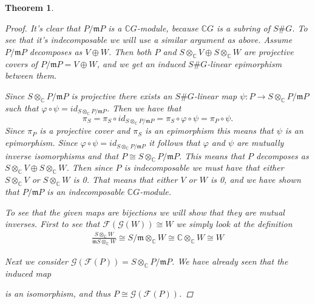\documentclass[11pt, a4paper, english]{article}
\newtheorem{theorem}{Theorem}[section]
\theoremstyle{definition}
\newcommand{\C}{\mathbb{C}}
\begin{document}
\begin{theorem}
\begin{proof}
It's clear that $P/\mathfrak{m}P$ is a $\C G$-module, because $\C G$ is a subring of $S\#G$. To see that it's indecomposable we will use a similar argument as above. Assume $P/\mathfrak{m}P$ decomposes as $V \oplus W$. Then both $P$ and $S\otimes_\C V \oplus S \otimes_\C W$ are projective covers of $P/\mathfrak{m}P = V\oplus W$, and we get an induced $S\#G$-linear epimorphism between them.

\begin{center}
\end{center}

Since $S \otimes_\C P/\mathfrak{m}P$ is projective there exists an $S\#G$-linear map $\psi: P \to S \otimes_\C P/\mathfrak{m}P$ such that $\varphi \circ \psi = id_{S \otimes_\C P/\mathfrak{m}P}$. Then we have that 
$$\pi_S = \pi_S \circ id_{S \otimes_\C P/\mathfrak{m}P} = \pi_S \circ \varphi \circ \psi = \pi_P \circ \psi.$$
Since $\pi_P$ is a projective cover and $\pi_S$ is an epimorphism this means that $\psi$ is an epimorphism. Since $\varphi \circ \psi = id_{S \otimes_\C P/\mathfrak{m}P}$ it follows that $\varphi$ and $\psi$ are mutually inverse isomorphisms and that $P \cong S \otimes_\C P/\mathfrak{m}P$. This means that $P$ decomposes as $S\otimes_\C V \oplus S \otimes_\C W$. Then since $P$ is indecomposable we must have that either $S \otimes_\C V$ or $S\otimes_\C W$ is 0. That means that either $V$ or $W$ is 0, and we have shown that $P/\mathfrak{m}P$ is an indecomposable $\C G$-module.

To see that the given maps are bijections we will show that they are mutual inverses. First to see that $\mathcal{F}(\mathcal{G}(W)) \cong W$ we simply look at the definition
\begin{equation*}
\begin{split}
\frac{S \otimes_\C W}{\mathfrak{m}S \otimes_\C W} \cong S/\mathfrak{m} \otimes_\C W \cong \C \otimes_\C W \cong W
\end{split}
\end{equation*}

Next we consider $\mathcal{G}(\mathcal{F}(P)) = S \otimes_\C P/\mathfrak{m}P$. We have already seen that the induced map
\begin{center}
\end{center}
is an isomorphism, and thus $P \cong \mathcal{G}(\mathcal{F}(P))$.
\end{proof}

\end{theorem}
\end{document}
